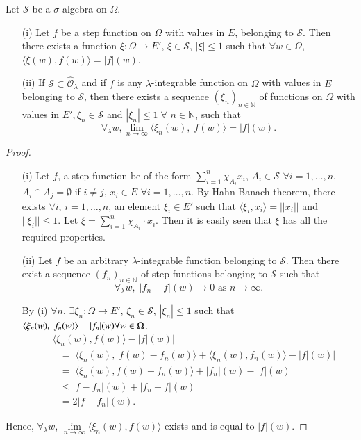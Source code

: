 \begin{lem}\label{part1:chap1:lem7}
Let $\mathcal{S}$ be a $\sigma$-algebra on $\Omega$. 
\begin{itemize}
\item[{\rm (i)}] Let $f$ be a step function on $\Omega$ with values in
  $E$, belonging to $\mathcal{S}$. Then there exists a function $\xi:
  \Omega \to E'$, $\xi \in\mathcal{S}$, $|\xi| \leq 1$ such that
  $\forall w \in \Omega$, $\langle \xi (w),f(w) \rangle = |f|(w)$. 

\item[{\rm (ii)}] If $\mathcal{S} \subset \hat{\mathscr{O}}_\lambda$
  and if $f$ is any $\lambda$-integrable function on $\Omega$ with
  values in $E$ belonging to $\mathcal{S}$, then there exists a
  sequence $(\xi_n)_{n \in \mathbb{N}}$ of functions on $\Omega$ with
  values in $E', \xi_n \in \mathcal{S}$ and $|\xi_n| \leq 1 \;
  \forall$ $n \in \mathbb{N}$, such that 
$$
\forall_\lambda w, \lim\limits_{n \to \infty} \langle \xi_n (w), \;
f(w)\rangle  = |f| (w). 
$$
\end{itemize}\pageoriginale
\end{lem}

\begin{proof}
\begin{itemize}
\item[{\rm (i)}] Let $f$, a step function be of the form $\sum\limits^n_{i=1}
\chi_{A_i} x_i$, $A_i \in \mathcal{S} $ $\forall i = 1, \ldots , n$,
$A_i \cap A_j = \emptyset$ if $i \neq j$, $x_i \in E$ $\forall i = 1,
\ldots ,n$. By Hahn-Banach theorem, there exists $\forall i$, $i = 1,
\ldots, n$, an element $\xi_i \in E'$ such that $\langle \xi_i,
x_i\rangle = ||x_i||$ and $||\xi_i|| \leq 1$. Let $\xi =
\sum\limits^n_{i=1} \chi_{A_i} \cdot x_i$. Then it is easily seen that
$\xi$ has all the required properties. 

\item[{\rm (ii)}] Let $f$ be an arbitrary $\lambda$-integrable
  function belonging to $\mathcal{S}$. Then there exist a sequence
  $(f_n)_{n \in \mathbb{N}}$ of step functions belonging to
  $\mathcal{S}$ such that 
$$
\forall_\lambda w, \; |f_n - f| (w) \to 0 \text{ as } n \to \infty. 
$$

By (i) $\forall n$, $\exists \xi_n : \Omega \to E'$, $\xi_n \in
\mathcal{S}$, $|\xi_n| \leq 1$ such that $\langle \xi_n (w),\break \; f_n
(w)\rangle = |f_n| (w) \forall w \in \Omega$. 
\begin{align*}
& \Big| \langle \xi_n (w), f(w) \rangle -|f|(w)\Big|\\
& \quad = \Big| \langle \xi_n (w), \; f(w) - f_n(w)\rangle + \langle
\xi_n (w), f_n (w)  \rangle - |f| (w) \Big|\\
& \quad = \Big| \langle \xi_n(w) , f(w) - f_n (w)\rangle + |f_n |(w) -
|f|(w)\Big| \\
& \quad \leq |f- f_n| (w) + |f_n -f| (w)\\
& \quad =  2 |f-f_n| (w). 
\end{align*}
\end{itemize}

Hence, $\forall _\lambda w$, $\lim\limits_{n \to \infty} \langle \xi_n
(w), f(w)\rangle $ exists and is equal to $|f|(w)$. 
\end{proof}

